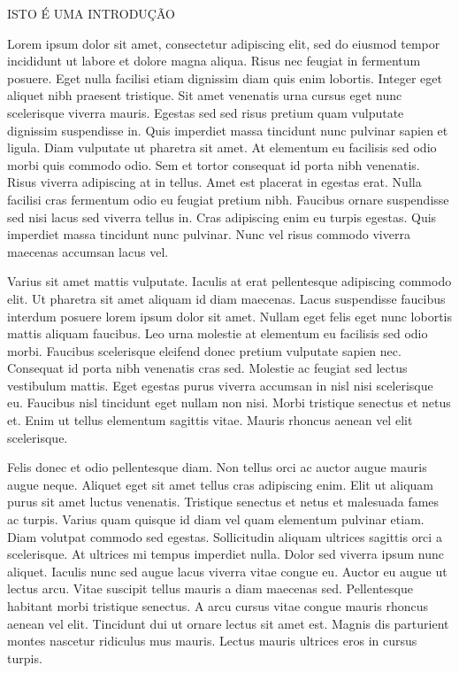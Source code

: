 ISTO É UMA INTRODUÇÃO

Lorem ipsum dolor sit amet, consectetur adipiscing elit, sed do eiusmod tempor incididunt ut labore et dolore magna aliqua. Risus nec feugiat in fermentum posuere. Eget nulla facilisi etiam dignissim diam quis enim lobortis. Integer eget aliquet nibh praesent tristique. Sit amet venenatis urna cursus eget nunc scelerisque viverra mauris. Egestas sed sed risus pretium quam vulputate dignissim suspendisse in. Quis imperdiet massa tincidunt nunc pulvinar sapien et ligula. Diam vulputate ut pharetra sit amet. At elementum eu facilisis sed odio morbi quis commodo odio. Sem et tortor consequat id porta nibh venenatis. Risus viverra adipiscing at in tellus. Amet est placerat in egestas erat. Nulla facilisi cras fermentum odio eu feugiat pretium nibh. Faucibus ornare suspendisse sed nisi lacus sed viverra tellus in. Cras adipiscing enim eu turpis egestas. Quis imperdiet massa tincidunt nunc pulvinar. Nunc vel risus commodo viverra maecenas accumsan lacus vel.

Varius sit amet mattis vulputate. Iaculis at erat pellentesque adipiscing commodo elit. Ut pharetra sit amet aliquam id diam maecenas. Lacus suspendisse faucibus interdum posuere lorem ipsum dolor sit amet. Nullam eget felis eget nunc lobortis mattis aliquam faucibus. Leo urna molestie at elementum eu facilisis sed odio morbi. Faucibus scelerisque eleifend donec pretium vulputate sapien nec. Consequat id porta nibh venenatis cras sed. Molestie ac feugiat sed lectus vestibulum mattis. Eget egestas purus viverra accumsan in nisl nisi scelerisque eu. Faucibus nisl tincidunt eget nullam non nisi. Morbi tristique senectus et netus et. Enim ut tellus elementum sagittis vitae. Mauris rhoncus aenean vel elit scelerisque.

Felis donec et odio pellentesque diam. Non tellus orci ac auctor augue mauris augue neque. Aliquet eget sit amet tellus cras adipiscing enim. Elit ut aliquam purus sit amet luctus venenatis. Tristique senectus et netus et malesuada fames ac turpis. Varius quam quisque id diam vel quam elementum pulvinar etiam. Diam volutpat commodo sed egestas. Sollicitudin aliquam ultrices sagittis orci a scelerisque. At ultrices mi tempus imperdiet nulla. Dolor sed viverra ipsum nunc aliquet. Iaculis nunc sed augue lacus viverra vitae congue eu. Auctor eu augue ut lectus arcu. Vitae suscipit tellus mauris a diam maecenas sed. Pellentesque habitant morbi tristique senectus. A arcu cursus vitae congue mauris rhoncus aenean vel elit. Tincidunt dui ut ornare lectus sit amet est. Magnis dis parturient montes nascetur ridiculus mus mauris. Lectus mauris ultrices eros in cursus turpis.

